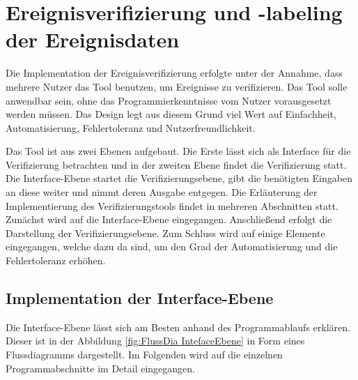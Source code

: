 \section{Ereignisverifizierung und -labeling der Ereignisdaten}
Die Implementation der Ereignisverifizierung erfolgte unter der Annahme, dass mehrere Nutzer das Tool benutzen, um Ereignisse zu verifizieren. Das Tool solle anwendbar sein, ohne das Programmierkenntnisse vom Nutzer vorausgesetzt werden müssen. Das Design legt aus diesem Grund viel Wert auf Einfachheit, Automatisierung, Fehlertoleranz und Nutzerfreundlichkeit. \par

Das Tool ist aus zwei Ebenen aufgebaut. Die Erste lässt sich als Interface für die Verifizierung betrachten und in der zweiten Ebene findet die Verifizierung statt. Die Interface-Ebene startet die Verifizierungsebene, gibt die benötigten Eingaben an diese weiter und nimmt deren Ausgabe entgegen. Die Erläuterung der Implementierung des Verifizierungstools findet in mehreren Abschnitten statt. Zunächst wird auf die Interface-Ebene eingegangen. Anschließend erfolgt die Darstellung der Verifizierungsebene. Zum Schluss wird auf einige Elemente eingegangen, welche dazu da sind, um den Grad der Automatisierung und die Fehlertoleranz erhöhen. 

\subsection{Implementation der Interface-Ebene} \label{sec:Umsetz VeriInterfaceEbene}
Die Interface-Ebene lässt sich am Besten anhand des Programmablaufs erklären. Dieser ist in der Abbildung \ref{fig:FlussDia IntefaceEbene} in Form eines Flussdiagramms dargestellt. Im Folgenden wird auf die einzelnen Programmabschnitte im Detail eingegangen. 

